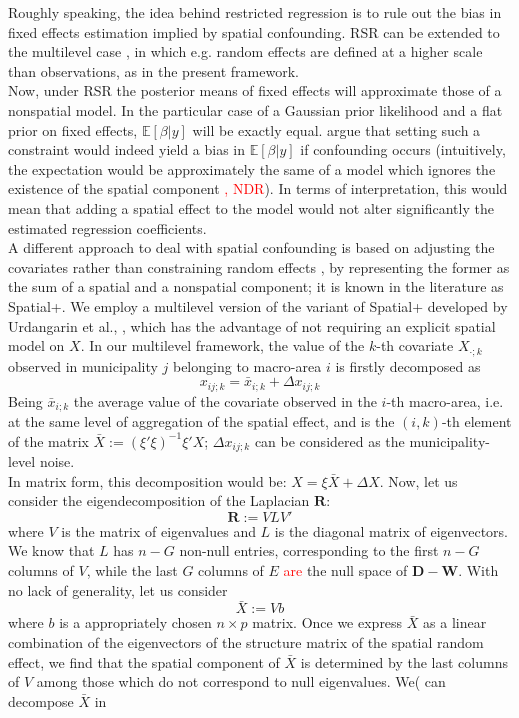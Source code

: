 \documentclass{article}
\begin{document}
Roughly speaking, the idea behind restricted regression is to rule out the bias in fixed effects estimation implied by spatial confounding. RSR can be extended to the multilevel case \cite{Nobre}, in which e.g. random effects are defined at a higher scale than observations, as in the present framework. \\ Now, under RSR the posterior means of fixed effects will approximate those of a nonspatial model. In the particular case of a Gaussian prior likelihood and a flat prior on fixed effects, $\mathbb{E}[\beta |y]$ will be exactly equal. \cite{DupontArXiv} argue that setting such a constraint would indeed yield a bias in $\mathbb{E}[\beta |y]$ if confounding occurs (intuitively, the expectation would be approximately the same of a model which ignores the existence of the spatial component \textcolor{red}{, NDR}). In terms of interpretation, this would mean that adding a spatial effect to the model would not alter significantly the estimated regression coefficients. \\
A different approach to deal with spatial confounding is based on adjusting the covariates rather than constraining random effects \cite{Dupont}, by representing the former as the sum of a spatial and a nonspatial component; it is known in the literature as Spatial+. We employ a multilevel version of the variant of Spatial+ developed by Urdangarin et al., \cite{Urdangarin24}, which has the advantage of not requiring an explicit spatial model on $X$. In our multilevel framework, the value of the $k$-th covariate $X_{\cdot; k}$ observed in municipality $j$ belonging to macro-area $i$ is firstly decomposed as
$$
x_{ij;k} = \bar{x}_{i;k} + \Delta x_{ij;k}
$$
Being $\bar{x}_{i;k}$ the average value of the covariate observed in the $i$-th macro-area, i.e. at the same level of aggregation of the spatial effect, and is the $(i, k)$-th element of the matrix $\bar{X}:=(\xi'\xi)^{-1}\xi'X$; $\Delta x_{ij;k}$ can be considered as the municipality-level noise. \\In matrix form, this decomposition would be: $X = \xi \bar{X} + \Delta X$. Now, let us consider the eigendecomposition of the Laplacian $\mathbf{R}$:
$$
\mathbf{R} := VLV'
$$ where $V$ is the matrix of eigenvalues and $L$ is the diagonal matrix of eigenvectors. We know that $L$ has $n-G$ non-null entries, corresponding to the first $n-G$ columns of $V$, while the last $G$ columns of $E$ \textcolor{red}{are} the null space of $\mathbf{D} - \mathbf{W}$.  
With no lack of generality, let us consider
$$
\bar{X} := Vb
$$ where $b$ is a appropriately chosen $n \times p$ matrix. Once we express $\bar{X}$ as a linear combination of the eigenvectors of the structure matrix of the spatial random effect, we find that the spatial component of $\bar{X}$ is determined by the last columns of $V$ among those which do not correspond to null eigenvalues. We( can decompose $\bar{X}$ in
\end{document}
